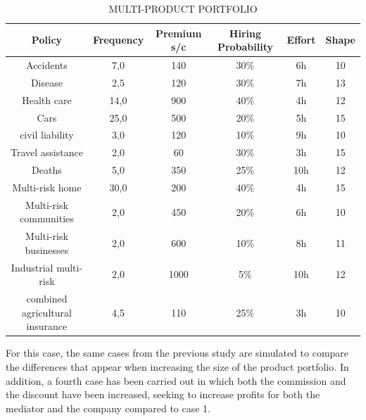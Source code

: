 \documentclass[review]{elsarticle}
\begin{document}
\begin{table}[htb]
\centering
\caption{MULTI-PRODUCT PORTFOLIO}
\label{tab:c1}
\begin{tabular}{c c c c c c }
        \hline
        \hline
        Policy & Frequency & Premium s/c & Hiring Probability & Effort & Shape \\
        \hline
        Accidents & 7,0 & 140 & 30\% & 6h & 10\\
        \hline
        Disease & 2,5 & 120 & 30\% & 7h & 13\\
        \hline 
        Health care & 14,0 & 900 & 40\% & 4h & 12\\
        \hline
         Cars & 25,0 & 500 & 20\% & 5h & 15\\
        \hline
         civil liability & 3,0 & 120 & 10\% & 9h & 10\\
        \hline
         Travel assistance & 2,0 & 60 & 30\% &  3h & 15\\
        \hline
         Deaths & 5,0 & 350 & 25\% & 10h & 12\\
        \hline
         Multi-risk home & 30,0 & 200 & 40\% & 4h & 15\\
        \hline
         Multi-risk communities & 2,0 & 450 & 20\% & 6h & 10\\
        \hline
         Multi-risk businesses & 2,0 & 600 & 10\% & 8h & 11\\
        \hline
         Industrial multi-risk & 2,0 & 1000 & 5\% & 10h & 12\\
        \hline
         combined agricultural insurance & 4,5 & 110 & 25\% & 3h & 10\\
        \hline
\end{tabular}
\end{table}

For this case, the same cases from the previous study are simulated to compare the differences that appear when increasing the size of the product portfolio. In addition, a fourth case has been carried out in which both the commission and the discount have been increased, seeking to increase profits for both the mediator and the company
compared to case 1.
\end{document}
